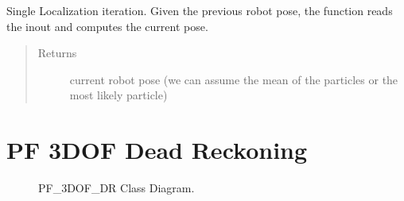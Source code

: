 \documentclass[letterpaper,10pt,english]{sphinxmanual}
\begin{document}
\begin{fulllineitems}
\begin{fulllineitems}
\begin{quote}
\begin{description}
\begin{itemize}
\end{itemize}

\end{description}\end{quote}

\end{fulllineitems}


\begin{fulllineitems}
\label{\detokenize{particle_filter:PFMBLocalization.PFMBL.Localize}}
\sphinxAtStartPar
Single Localization iteration. Given the previous robot pose, the function reads the inout and computes the current pose.
\begin{quote}\begin{description}
\item[{Returns}] \leavevmode
\sphinxAtStartPar
{} current robot pose (we can assume the mean of the particles or the most likely particle)

\end{description}\end{quote}

\end{fulllineitems}


\end{fulllineitems}



\section{PF 3DOF Dead Reckoning}
\label{\detokenize{particle_filter:pf-3dof-dead-reckoning}}
\begin{figure}[htbp]
\centering
\capstart

\noindent{}
\caption{PF\_3DOF\_DR Class Diagram.}\label{\detokenize{particle_filter:id4}}\end{figure}
\end{document}
